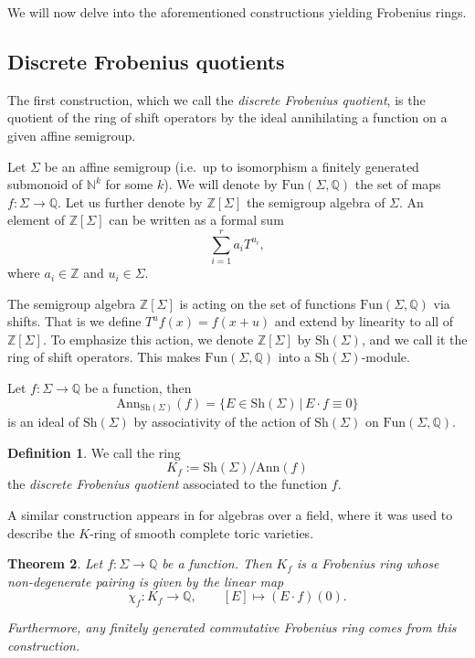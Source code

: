 \documentclass[oneside]{amsart}
\theoremstyle{plain}
\newtheorem{theorem}{Theorem}[section]
\theoremstyle{definition}
\newtheorem{definition}[theorem]{Definition}
\newcommand{\Z}{{\mathbb{Z}}}
\newcommand{\N}{{\mathbb{N}}}
\newcommand{\Q}{{\mathbb{Q}}}
\newcommand{\Ann}{{\mathrm{Ann}}}
\newcommand{\Fun}{{\mathrm{Fun}}}
\newcommand{\Sh}{{\mathrm{Sh}}}
\begin{document}
We will now delve into the aforementioned constructions yielding Frobenius rings.

\subsection{Discrete Frobenius quotients}

The first construction, which we call the \emph{discrete Frobenius quotient}, is the quotient of the ring of shift operators by the ideal annihilating a function on a given affine semigroup.

Let $\Sigma$ be an affine semigroup (i.e.\ up to isomorphism a finitely generated submonoid of $\N^k$ for some $k$).
We will denote by $\Fun(\Sigma,\Q)$ the set of maps $f:\Sigma\to \Q$.
Let us further denote by $\Z[\Sigma]$ the semigroup algebra of $\Sigma$. An element of $\Z[\Sigma]$ can be written as a formal sum
\[
\sum_{i = 1}^r a_i T^{u_i},
\]
where $a_i \in \Z$ and $u_i \in \Sigma$.

The semigroup algebra $\Z[\Sigma]$ is acting on the set of functions
$\Fun(\Sigma,\Q)$ via shifts.
That is we define $T^u f(x) = f(x + u)$ and extend by linearity to all of $\Z[\Sigma]$.
To emphasize this action, we denote $\Z[\Sigma]$ by $\Sh(\Sigma)$, and we call it the ring of shift operators.
This makes $\Fun(\Sigma, \Q)$ into a $\Sh(\Sigma)$-module.

Let $f: \Sigma \to \Q$ be a function, then 
\[
\Ann_{\Sh(\Sigma)}(f) = \{E \in \Sh(\Sigma) \,|\, E \cdot f \equiv 0\}
\]
is an ideal of $\Sh(\Sigma)$ by associativity of the action of $\Sh(\Sigma)$ on $\Fun(\Sigma, \Q)$.

\begin{definition}
We call the ring 
\[K_f := \Sh(\Sigma)/\Ann(f)\]
the \emph{discrete Frobenius quotient} associated to the function $f$.
\end{definition}

A similar construction appears in \cite[Theorem 2.2, Theorem 2.3]{MoninSmirnov23} for algebras over a field, where it was used to describe the $K$-ring of smooth complete toric varieties.

\begin{theorem}\label{thm:shiftalg}
    Let $f:\Sigma \to \Q$ be a function.
    Then $K_f$ is a Frobenius ring whose non-degenerate pairing is
    given by the linear map
    \[
    \chi_f: K_f\to \Q,\qquad [E] \mapsto (E \cdot f)(0).
    \]
    
    Furthermore, any finitely generated commutative Frobenius ring comes from this construction.
\end{theorem}
\end{document}
